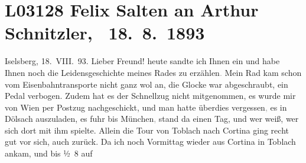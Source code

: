 

\section[ Felix Salten an Arthur Schnitzler, 18. 8. 1893]{L03128 Felix Salten an Arthur Schnitzler,  18. 8. 1893}
\nopagebreak{}
\rehead{ }\normalsize\beginnumbering{}
\toendnotes[C]{\smallbreak\pagebreak[2]}
\toendnotes[C]{\smallbreak}
\toendnotes[C]{\smallbreak}
\pstart
           \raggedleft{}{\pb}Iselsberg, 18. VIII. 93.\pend
           \vspace{0.5em}
\pstart
           Lieber Freund!{ }heute sandte ich Ihnen ein \label{K_L03128-1v}\label{K_L03128-1} und habe Ihnen noch die Leidensgeschichte meines Rades zu
                  erzählen\textcolor{gray}{.} Mein Rad kam schon vom Eisenbahntransporte nicht ganz
               wol an, die Glocke war abgeschraubt, ein Pedal verbogen. Zudem hat es der Schnellzug
               nicht mitgenommen, es wurde mir von Wien per
               Postzug nachgeschickt, und man hatte überdies vergessen\textcolor{gray}{,} es in Dölsach auszuladen, es fuhr bis München\textcolor{gray}{,} stand da einen Tag, und wer weiß, wer sich dort mit ihm spielte.
               Allein die Tour von Toblach nach Cortina ging recht gut vor sich, auch zurück. Da ich noch
                  Vormittag wieder aus Cortina in
                  Toblach ankam, und bis ½ 8 auf
